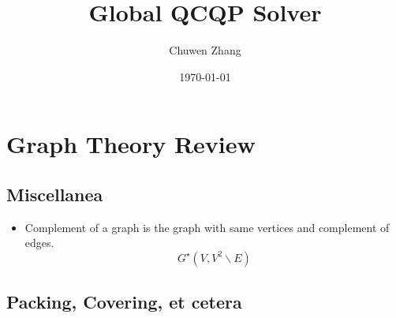 
\title{Global QCQP Solver}
\author{Chuwen Zhang}
\date{\today}


\usepackage{subfiles}
\usepackage{graphicx} 
\usepackage{subfiles} 
\usepackage{subfig}
\usepackage[table]{xcolor}
\usepackage{mathrsfs}
\usepackage[font=small,labelfont=bf]{caption}

% 
% 
% 
% 
% 
% 


\section{Graph Theory Review}

\subsection{Miscellanea}
\begin{itemize}
      \item Complement of a graph is the graph with same vertices and complement of edges.
            \[G^\star\left(V, V^2 \backslash E\right)\]

\end{itemize}
\subsection{Packing, Covering, et cetera}



